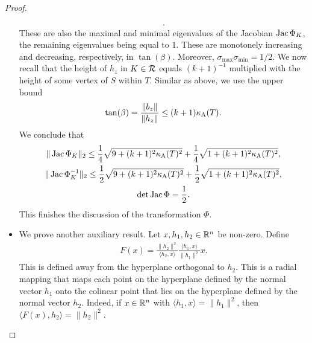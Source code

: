 \documentclass[10pt,letterpaper]{article}
\begin{document}
\begin{proof}
\begin{itemize}
\begin{align*}
            .
        \end{align*}
        These are also the maximal and minimal eigenvalues of the Jacobian $\operatorname{{\rm Jac}} \Phi_{K}$, the remaining eigenvalues being equal to $1$. 
        These are monotonely increasing and decreasing, respectively, in $\tan(\beta)$. 
        Moreover, $\sigma_{\max} \sigma_{\min} = 1/2$. 
        We now recall that the height of $h_{z}$ in $K \in {\mathcal R}$ equals $(k+1)^{-1}$ multiplied with the height of some vertex of $S$ within $T$.
        Similar as above, we use the upper bound 
        \begin{align*}
            \tan(\beta) = \frac{\|  b_{z}  \|}{\|  h_{z}  \|} \leq (k+1) \kappa_{\rm A}(T).
        \end{align*}
        We conclude that 
        \begin{gather*}
            \|  \operatorname{{\rm Jac}}\Phi_{K}  \|_{2} 
            \leq 
            \frac 1 4 \sqrt{ 9 + (k+1)^2 \kappa_{\rm A}(T)^2 } + \frac 1 4 \sqrt{ 1 + (k+1)^2 \kappa_{\rm A}(T)^2 }
            ,
            \\
            \|  \operatorname{{\rm Jac}}\Phi_{K}^{-1}  \|_{2} 
            \leq 
            \frac 1 2 \sqrt{ 9 + (k+1)^2 \kappa_{\rm A}(T)^2 } + \frac 1 2 \sqrt{ 1 + (k+1)^2 \kappa_{\rm A}(T)^2 }
            ,
            \\
            \det \operatorname{{\rm Jac}}\Phi = \frac 1 2 
            .
        \end{gather*}
        This finishes the discussion of the transformation $\Phi$.






        

        
        
        \item 
        We prove another auxiliary result.
        Let $x, h_1, h_2 \in {\mathbb R}^{n}$ be non-zero. 
        Define 
        \begin{align*}
            F(x) 
            = 
            \frac{ \| h_2 \|^{2} }{ \langle h_2, x \rangle }
            \frac{ \langle h_1, x \rangle }{ \| h_1 \|^{2} }
            x
            .
        \end{align*}
        This is defined away from the hyperplane orthogonal to $h_2$.
        This is a radial mapping that maps each point on the hyperplane defined by the normal vector $h_1$
        onto the colinear point that lies on the hyperplane defined by the normal vector $h_2$. Indeed, 
        if $x \in {\mathbb R}^{n}$ with $\langle h_1, x \rangle = \| h_1 \|^{2}$, then $\langle F(x), h_2 \rangle = \| h_2 \|^{2}$.
        

\end{itemize}
\end{proof}
\end{document}
